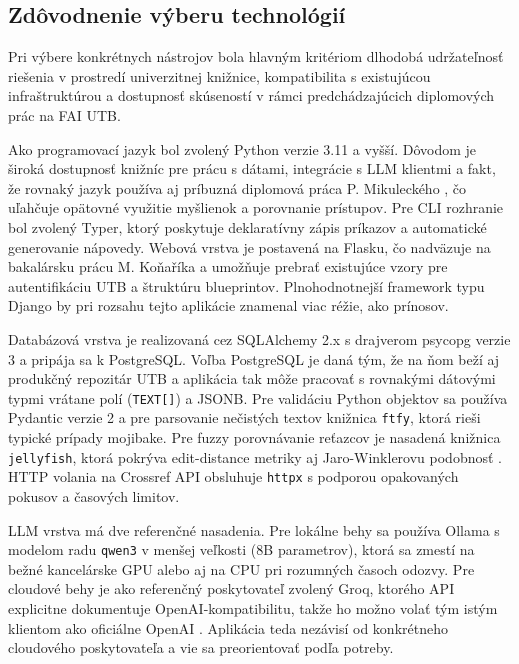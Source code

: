 \subsection{Zdôvodnenie výberu technológií}

Pri výbere konkrétnych nástrojov bola hlavným kritériom dlhodobá udržateľnosť riešenia v prostredí univerzitnej knižnice, kompatibilita s existujúcou infraštruktúrou a dostupnosť skúseností v rámci predchádzajúcich diplomových prác na FAI UTB.

Ako programovací jazyk bol zvolený Python verzie 3.11 a vyšší. Dôvodom je široká dostupnosť knižníc pre prácu s dátami, integrácie s LLM klientmi a fakt, že rovnaký jazyk používa aj príbuzná diplomová práca P. Mikuleckého \cite{Mikulecky2025}, čo uľahčuje opätovné využitie myšlienok a porovnanie prístupov. Pre CLI rozhranie bol zvolený Typer, ktorý poskytuje deklaratívny zápis príkazov a automatické generovanie nápovedy. Webová vrstva je postavená na Flasku, čo nadväzuje na bakalársku prácu M. Koňaříka \cite{Konarik2025} a umožňuje prebrať existujúce vzory pre autentifikáciu UTB a štruktúru blueprintov. Plnohodnotnejší framework typu Django by pri rozsahu tejto aplikácie znamenal viac réžie, ako prínosov.

Databázová vrstva je realizovaná cez SQLAlchemy 2.x s drajverom psycopg verzie 3 a pripája sa k PostgreSQL. Voľba PostgreSQL je daná tým, že na ňom beží aj produkčný repozitár UTB a aplikácia tak môže pracovať s rovnakými dátovými typmi vrátane polí (\texttt{TEXT[]}) a JSONB. Pre validáciu Python objektov sa používa Pydantic verzie 2 a pre parsovanie nečistých textov knižnica \texttt{ftfy}, ktorá rieši typické prípady mojibake. Pre fuzzy porovnávanie reťazcov je nasadená knižnica \texttt{jellyfish}, ktorá pokrýva edit-distance metriky aj Jaro-Winklerovu podobnosť \cite{Christen2012,Winkler1990}. HTTP volania na Crossref API obsluhuje \texttt{httpx} s podporou opakovaných pokusov a časových limitov.

LLM vrstva má dve referenčné nasadenia. Pre lokálne behy sa používa Ollama s modelom radu \texttt{qwen3} v menšej veľkosti (8B parametrov), ktorá sa zmestí na bežné kancelárske GPU alebo aj na CPU pri rozumných časoch odozvy. Pre cloudové behy je ako referenčný poskytovateľ zvolený Groq, ktorého API explicitne dokumentuje OpenAI-kompatibilitu, takže ho možno volať tým istým klientom ako oficiálne OpenAI \cite{GroqOpenAICompatibility}. Aplikácia teda nezávisí od konkrétneho cloudového poskytovateľa a vie sa preorientovať podľa potreby.

